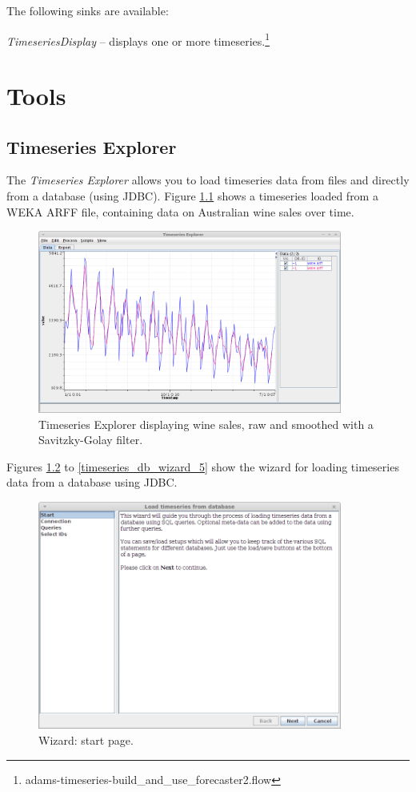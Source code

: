 \documentclass[a4paper]{book}
\begin{document}
\noindent The following sinks are available:
\begin{tight_itemize}
	\item \textit{TimeseriesDisplay} -- displays one or more 
	timeseries.\footnote{adams-timeseries-build\_and\_use\_forecaster2.flow}
\end{tight_itemize}

\chapter{Tools}
\section{Timeseries Explorer}
The \textit{Timeseries Explorer} allows you to load timeseries data from files
and directly from a database (using JDBC). Figure \ref{timeseries_explorer}
shows a timeseries loaded from a WEKA ARFF file, containing data on Australian
wine sales over time.

\begin{figure}[htb]
  \centering
  \includegraphics[width=10.0cm]{images/timeseries_explorer.png}
  \caption{Timeseries Explorer displaying wine sales, raw and smoothed with a Savitzky-Golay filter.}
  \label{timeseries_explorer}
\end{figure}

Figures \ref{timeseries_db_wizard_1} to \ref{timeseries_db_wizard_5} show
the wizard for loading timeseries data from a database using JDBC.

\begin{figure}[htb]
  \centering
  \includegraphics[width=10.0cm]{images/timeseries_db_wizard_1.png}
  \caption{Wizard: start page.}
  \label{timeseries_db_wizard_1}
\end{figure}
\end{document}
